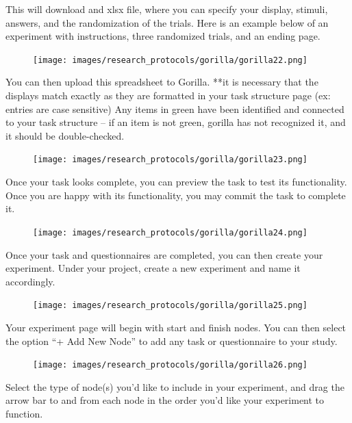 \documentclass[
]{book}
\begin{document}
This will download and xlsx file, where you can specify your display, stimuli, answers, and the randomization of the trials. Here is an example below of an experiment with instructions, three randomized trials, and an ending page.

\begin{figure}
\centering
\texttt{[image: images/research\_protocols/gorilla/gorilla22.png]}
\caption{}
\end{figure}

You can then upload this spreadsheet to Gorilla. **it is necessary that the displays match exactly as they are formatted in your task structure page (ex: entries are case sensitive) Any items in green have been identified and connected to your task structure -- if an item is not green, gorilla has not recognized it, and it should be double-checked.

\begin{figure}
\centering
\texttt{[image: images/research\_protocols/gorilla/gorilla23.png]}
\caption{}
\end{figure}

Once your task looks complete, you can preview the task to test its functionality. Once you are happy with its functionality, you may commit the task to complete it.

\begin{figure}
\centering
\texttt{[image: images/research\_protocols/gorilla/gorilla24.png]}
\caption{}
\end{figure}

Once your task and questionnaires are completed, you can then create your experiment. Under your project, create a new experiment and name it accordingly.

\begin{figure}
\centering
\texttt{[image: images/research\_protocols/gorilla/gorilla25.png]}
\caption{}
\end{figure}

Your experiment page will begin with start and finish nodes. You can then select the option ``+ Add New Node'' to add any task or questionnaire to your study.

\begin{figure}
\centering
\texttt{[image: images/research\_protocols/gorilla/gorilla26.png]}
\caption{}
\end{figure}

Select the type of node(s) you'd like to include in your experiment, and drag the arrow bar to and from each node in the order you'd like your experiment to function.
\end{document}
